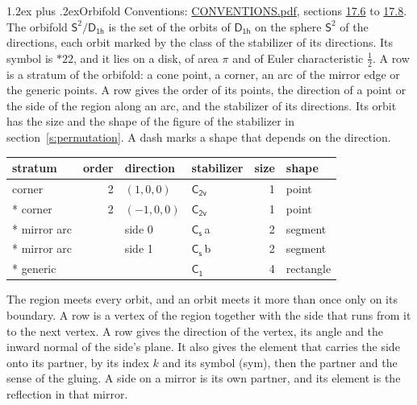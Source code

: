 \documentclass[10pt,a4paper]{article}
\makeatletter
\renewcommand\section{\@startsection{section}{1}{\z@}{-3ex plus -1ex minus -.2ex}%
  {1.2ex plus .2ex}{\normalfont\large\sffamily\bfseries\color{parttitle}}}
\numberwithin{equation}{section}
\newcommand{\grp}[1]{\mathsf{#1}}
\newcommand{\orbname}[1]{#1}
\newcommand{\clsletter}[1]{\,{\scriptsize\color{black!55}#1}}
\newcommand{\dirvec}[3]{(#1, #2, #3)}
\newcommand{\twosphere}{\mathsf{S}^{2}}
\makeatother
\begin{document}
\section{Orbifold}\label{s:orbifold}
Conventions: \href{../../CONVENTIONS.pdf}{CONVENTIONS.pdf}, sections \href{../../CONVENTIONS.pdf\#conv.17.6}{17.6} to \href{../../CONVENTIONS.pdf\#conv.17.8}{17.8}.
The orbifold $\twosphere/\grp{D_{1h}}$ is the set of the orbits of $\grp{D_{1h}}$ on the sphere $\twosphere$ of the directions, each orbit marked by the class of the stabilizer of its directions. Its symbol is $\orbname{{\ast}22}$, and it lies on a disk, of area $\pi$ and of Euler characteristic $\tfrac{1}{2}$.
\leavevmode\label{n:head.stratum}\label{n:head.order.point}\label{n:head.direction}\label{n:head.stabilizer}\label{n:head.size.orbit}\label{n:head.shape}A row is a stratum of the orbifold: a cone point, a corner, an arc of the mirror edge or the generic points. A row gives the order of its points, the direction of a point or the side of the region along an arc, and the stabilizer of its directions. Its orbit has the size and the shape of the figure of the stabilizer in section~\ref{s:permutation}. A dash marks a shape that depends on the direction.
{\small\setlength{\tabcolsep}{4pt}\begin{longtable}{@{}lrllrl@{}}\toprule
stratum & order & direction & stabilizer & size & shape\\\midrule\endhead
\bottomrule\endfoot\endlastfoot
corner & 2 & $\dirvec{1}{0}{0}$ & \href{C2v.pdf}{$\grp{C_{2v}}$} & 1 & point\\*
corner & 2 & $\dirvec{-1}{0}{0}$ & \href{C2v.pdf}{$\grp{C_{2v}}$} & 1 & point\\*
mirror arc &  & side 0 & \href{C1v.pdf}{$\grp{C_{s}}$}\clsletter{a} & 2 & segment\\*
mirror arc &  & side 1 & \href{C1v.pdf}{$\grp{C_{s}}$}\clsletter{b} & 2 & segment\\*
generic &  &  & \href{C1.pdf}{$\grp{C_{1}}$} & 4 & rectangle\\
\bottomrule\end{longtable}}
\leavevmode\label{n:head.vertex.region}\label{n:head.angle}\label{n:head.normal.side}\label{n:head.partner}\label{n:head.sense}The region meets every orbit, and an orbit meets it more than once only on its boundary. A row is a vertex of the region together with the side that runs from it to the next vertex. A row gives the direction of the vertex, its angle and the inward normal of the side's plane. It also gives the element that carries the side onto its partner, by its index $k$ and its symbol (sym), then the partner and the sense of the gluing. A side on a mirror is its own partner, and its element is the reflection in that mirror.
\end{document}
